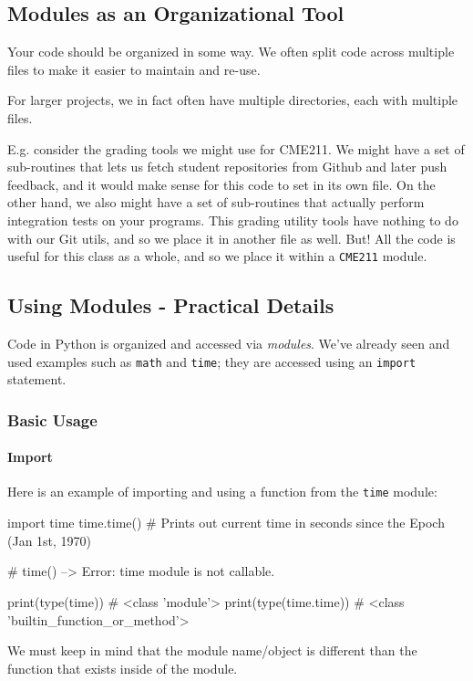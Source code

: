 \documentclass[12pt,letterpaper,twoside]{article}
\begin{document}
\begin{enumerate}
\subsection{Modules as an Organizational Tool} Your code should be organized in some way.
We often split code across multiple files to make it easier to maintain and re-use.

For larger projects, we in fact often have multiple directories, each with multiple files.

E.g. consider the grading tools we might use for CME211. We might have a set of sub-routines that lets
us fetch student repositories from Github and later push feedback, and it would make sense for this code
to set in its own file. On the other hand, we also might have a set of sub-routines that actually
perform integration tests on your programs. This grading utility tools have nothing to do with our Git utils, and so we place it
in another file as well. But! All the code is useful for this class as a whole, and so we place it within a \texttt{CME211} module.

\subsection{Using Modules - Practical Details} Code in Python is organized and accessed via \emph{modules}. We've already seen and used  examples such as
\texttt{math} and \texttt{time}; they are accessed using an \texttt{import} statement.

\subsubsection{Basic Usage}
\paragraph{Import}
Here is an example of importing and using a function from the
\texttt{time} module:

\begin{python}
import time
time.time()    # Prints out current time in seconds since the Epoch (Jan 1st, 1970)

# time()                --> Error: time module is not callable.

print(type(time))       # <class 'module'>
print(type(time.time))  # <class 'builtin_function_or_method'>

\end{python}
We must keep in mind that the module name/object is different 
than the function that exists inside of the module.


\end{enumerate}
\end{document}

